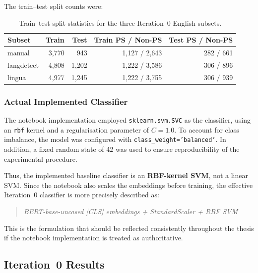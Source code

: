 \documentclass[11pt, titlepage, bibliography=totoc]{scrreprt}
\begin{document}

The train--test split counts were:

\begin{table}[h!]
\centering
\caption{Train--test split statistics for the three Iteration~0 English subsets.}
\label{tab:iter0_train_test_split}
\begin{tabular}{lrrrr}
\toprule
\textbf{Subset} & \textbf{Train} & \textbf{Test} & \textbf{Train PS / Non-PS} & \textbf{Test PS / Non-PS} \\
\midrule
manual     & 3,770 &   943 & 1,127 / 2,643 & 282 / 661 \\
langdetect & 4,808 & 1,202 & 1,222 / 3,586 & 306 / 896 \\
lingua     & 4,977 & 1,245 & 1,222 / 3,755 & 306 / 939 \\
\bottomrule
\end{tabular}
\end{table}


\subsubsection{Actual Implemented Classifier}

The notebook implementation employed \texttt{sklearn.svm.SVC} as the classifier, using an \texttt{rbf} kernel and a regularisation parameter of $C = 1.0$. To account for class imbalance, the model was configured with \texttt{class\_weight='balanced'}. In addition, a fixed random state of 42 was used to ensure reproducibility of the experimental procedure.

Thus, the implemented baseline classifier is an \textbf{RBF-kernel SVM}, not a linear SVM. Since the notebook also scales the embeddings before training, the effective Iteration~0 classifier is more precisely described as:

\begin{quote}
\textit{BERT-base-uncased [CLS] embeddings + StandardScaler + RBF SVM}
\end{quote}

This is the formulation that should be reflected consistently throughout the thesis if the notebook implementation is treated as authoritative.


\subsection{Iteration~0 Results}
\end{document}
